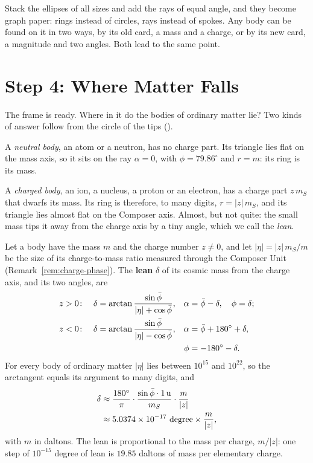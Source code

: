 \begin{plainwords}
Stack the ellipses of all sizes and add the rays of equal angle, and they become graph paper: rings instead of circles, rays instead of spokes. Any body can be found on it in two ways, by its old card, a mass and a charge, or by its new card, a magnitude and two angles. Both lead to the same point.
\end{plainwords}

\section{Step 4: Where Matter Falls}\label{sec:sm-where}

The frame is ready. Where in it do the bodies of ordinary matter lie? Two kinds of answer follow from the circle of the tips ().

A \emph{neutral body}, an atom or a neutron, has no charge part. Its triangle lies flat on the mass axis, so it sits on the ray $\alpha = 0$, with $\phi = 79.86^\circ$ and $r = m$: its ring is its mass.

A \emph{charged body}, an ion, a nucleus, a proton or an electron, has a charge part $z\,m_S$ that dwarfs its mass. Its ring is therefore, to many digits, $r = |z|\,m_S$, and its triangle lies almost flat on the Composer axis. Almost, but not quite: the small mass tips it away from the charge axis by a tiny angle, which we call the \emph{lean}.

\begin{remark}\label{rem:lean}
Let a body have the mass $m$ and the charge number $z \neq 0$, and let $|\eta| = |z|\,m_S/m$ be the size of its charge-to-mass ratio measured through the Composer Unit (Remark~\ref{rem:charge-phase}). The \textbf{lean} $\delta$ of its cosmic mass from the charge axis, and its two angles, are
\begin{align*}
z > 0\colon\quad \delta &= \arctan\frac{\sin\bar{\phi}}{|\eta| + \cos\bar{\phi}}, & \alpha &= \bar{\phi} - \delta, \quad \phi = \delta; \\
z < 0\colon\quad \delta &= \arctan\frac{\sin\bar{\phi}}{|\eta| - \cos\bar{\phi}}, & \alpha &= \bar{\phi} + 180^\circ + \delta, \\
& & \phi &= -180^\circ - \delta.
\end{align*}
For every body of ordinary matter $|\eta|$ lies between $10^{15}$ and $10^{22}$, so the arctangent equals its argument to many digits, and
\begin{align*}
\delta &\approx \frac{180^\circ}{\pi}\cdot\frac{\sin\bar{\phi} \cdot 1\,\mathrm{u}}{m_S}\cdot\frac{m}{|z|} \\
&\approx 5.0374 \times 10^{-17}\ \text{degree} \times \frac{m}{|z|},
\end{align*}
with $m$ in daltons. The lean is proportional to the mass per charge, $m/|z|$: one step of $10^{-15}$ degree of lean is $19.85$ daltons of mass per elementary charge.
\end{remark}


